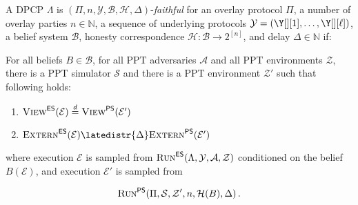 \begin{definition}
  A DPCP $\Lambda$
  is $(\Pi, n, \mathcal{Y}, \mathcal{B}, \mathcal{H}, \Delta)$-\emph{faithful}
  for an overlay protocol $\Pi$,
  a number of overlay parties $n \in \mathbb{N}$,
  a sequence of underlying protocols $\mathcal{Y} = (\Y[][1], \ldots, \Y[][\ell])$,
  a belief system $\mathcal{B}$,
  honesty correspondence $\mathcal{H}: \mathcal{B} \longrightarrow 2^{[n]}$,
  and delay $\Delta \in \mathbb{N}$ if:

  For all beliefs $B \in \mathcal{B}$,
  for all PPT adversaries $\mathcal{A}$ and all PPT environments $\mathcal{Z}$,
  there is a PPT simulator $\mathcal{S}$ and there is a
  PPT environment $\mathcal{Z}'$ such that following holds:

  \begin{enumerate}
    \item $\LCView(\mathcal{E}) \distreq \PEView(\mathcal{E}')$
    \item $\LCExtern(\mathcal{E}) \latedistr{\Delta} \PEExtern(\mathcal{E}')$
  \end{enumerate}

  where execution $\mathcal{E}$ is sampled from
  $\textsc{Run}^{\textsf{ES}}(\Lambda, \mathcal{Y}, \mathcal{A}, \mathcal{Z})$
  conditioned on the belief $B(\mathcal{E})$,
  and execution $\mathcal{E}'$ is sampled from

  \[
  \textsc{Run}^{\textsf{PS}}(\Pi, \mathcal{S}, \mathcal{Z}', n, \mathcal{H}(B), \Delta)\,.
  \]
\end{definition}



